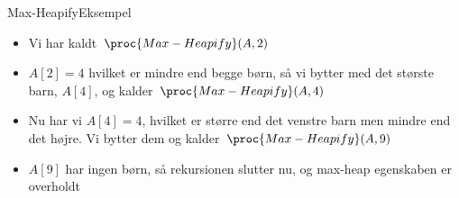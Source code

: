 \documentclass[aspectratio=1610]{beamer}
\begin{document}
\begin{frame}{Max-Heapify}{Eksempel}
    \begin{figure}[h]
        \centering
    \end{figure}

    \begin{itemize}
        \item<1-> Vi har kaldt $\proc{Max-Heapify}(A,2)$
        \item<2-> $A[2] = 4$ hvilket er mindre end begge børn, så vi bytter
            med det største barn, $A[4]$, og kalder $\proc{Max-Heapify}(A,4)$
        \item<3-> Nu har vi $A[4] = 4$, hvilket er større end det venstre
            barn men mindre end det højre. Vi bytter dem og kalder
            $\proc{Max-Heapify}(A,9)$
        \item<4-> $A[9]$ har ingen børn, så rekursionen slutter nu, og max-heap
            egenskaben er overholdt
    \end{itemize}
\end{frame}
\end{document}
